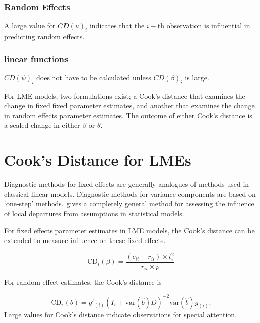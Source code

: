 \documentclass[12pt, a4paper]{report}
\theoremstyle{plain}
\theoremstyle{definition}
\theoremstyle{remark}
\begin{document}
		
		\subsubsection{Random Effects}
		
		A large value for $CD(u)_i$ indicates that the $i-$th observation is influential in predicting random effects.
		
		\subsubsection{linear functions}
		
		$CD(\psi)_i$ does not have to be calculated unless $CD(\beta)_i$ is large.
		
		
		For LME models, two formulations exist; a Cook's distance that examines the change in fixed fixed parameter estimates, and another that examines the change in random effects parameter estimates. The outcome of either Cook's distance is a scaled change in either $\beta$ or $\theta$.
		
		
		
		
		\section{Cook's Distance for LMEs} %
		Diagnostic methods for fixed effects are generally analogues of methods used in classical linear models.
		Diagnostic methods for variance components are based on `one-step' methods. \citet{cook86} gives a completely general method for assessing the influence of local departures from assumptions in statistical models.
		
		For fixed effects parameter estimates in LME models, the  Cook's distance can be extended to measure influence on these fixed effects.
		
		\[
		\mbox{CD}_{i}(\beta) = \frac{(c_{ii} - r_{ii}) \times t^2_{i}}{r_{ii} \times p}
		\]
		
		For random effect estimates, the  Cook's distance is
		
		\[
		\mbox{CD}_{i}(b) = g{\prime}_{(i)} (I_{r} + \mbox{var}(\hat{b})D)^{-2}\mbox{var}(\hat{b})g_{(i)}.
		\]
		Large values for Cook's distance indicate observations for special attention.
		
\end{document}

